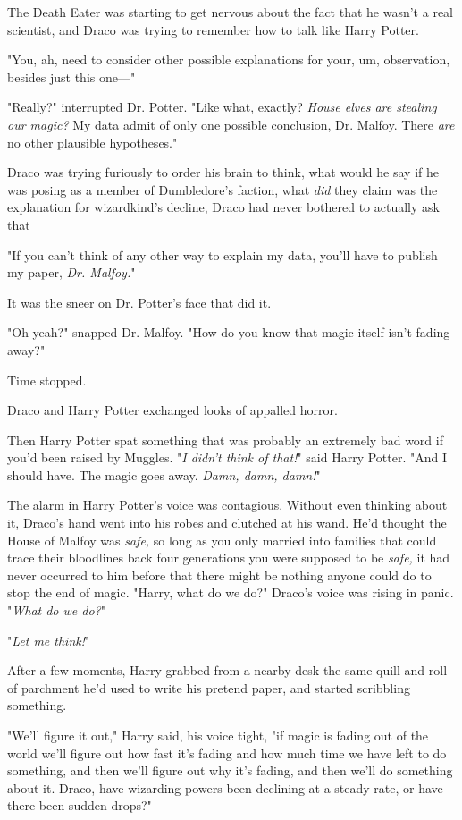 The Death Eater was starting to get nervous about the fact that he wasn't a
real scientist, and Draco was trying to remember how to talk like Harry Potter.

"You, ah, need to consider other possible explanations for your, um,
observation, besides just this one—"

"Really?" interrupted Dr. Potter. "Like what, exactly? \emph{House elves are
stealing our magic?} My data admit of only one possible conclusion, Dr. Malfoy.
There \emph{are} no other plausible hypotheses."

Draco was trying furiously to order his brain to think, what would he say if he
was posing as a member of Dumbledore's faction, what \emph{did} they claim was
the explanation for wizardkind's decline, Draco had never bothered to actually
ask that{\el}

"If you can't think of any other way to explain my data, you'll have to publish
my paper, \emph{Dr. Malfoy.}"

It was the sneer on Dr. Potter's face that did it.

"Oh yeah?" snapped Dr. Malfoy. "How do you know that magic itself isn't fading
away?"

Time stopped.

Draco and Harry Potter exchanged looks of appalled horror.

Then Harry Potter spat something that was probably an extremely bad word if
you'd been raised by Muggles. "\emph{I didn't think of that!}" said Harry
Potter. "And I should have. The magic goes away. \emph{Damn, damn, damn!}"

The alarm in Harry Potter's voice was contagious. Without even thinking about
it, Draco's hand went into his robes and clutched at his wand. He'd thought the
House of Malfoy was \emph{safe,} so long as you only married into families that
could trace their bloodlines back four generations you were supposed to be
\emph{safe,} it had never occurred to him before that there might be nothing
anyone could do to stop the end of magic. "Harry, what do we do?" Draco's voice
was rising in panic. "\emph{What do we do?}"

"\emph{Let me think!}"

After a few moments, Harry grabbed from a nearby desk the same quill and roll
of parchment he'd used to write his pretend paper, and started scribbling
something.

"We'll figure it out," Harry said, his voice tight, "if magic is fading out of
the world we'll figure out how fast it's fading and how much time we have left
to do something, and then we'll figure out why it's fading, and then we'll do
something about it. Draco, have wizarding powers been declining at a steady
rate, or have there been sudden drops?"

